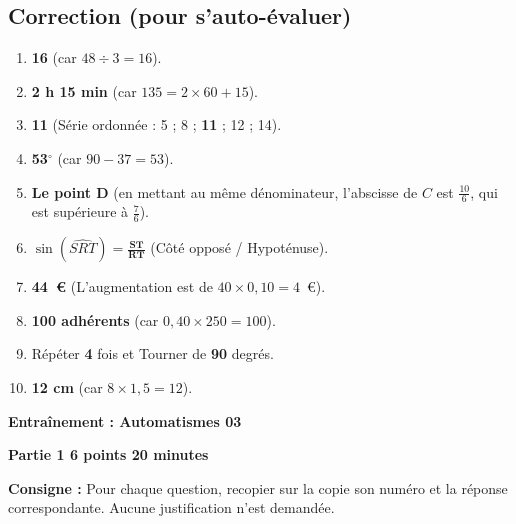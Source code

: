 \documentclass[a4paper,11pt]{article}
\begin{document}
\newpage

\subsection*{Correction (pour s'auto-évaluer)}
\begin{enumerate}[label=\textbf{\arabic*.}]
    \item \textbf{16} (car $48 \div 3 = 16$).
    \item \textbf{2 h 15 min} (car $135 = 2 \times 60 + 15$).
    \item \textbf{11} (Série ordonnée : 5 ; 8 ; \textbf{11} ; 12 ; 14).
    \item \textbf{53$^{\circ}$} (car $90 - 37 = 53$).
    \item \textbf{Le point D} (en mettant au même dénominateur, l'abscisse de $C$ est $\frac{10}{6}$, qui est supérieure à $\frac{7}{6}$).
    \item $\sin(\widehat{SRT}) = \mathbf{\frac{ST}{RT}}$ (Côté opposé / Hypoténuse).
    \item \textbf{44~€} (L'augmentation est de $40 \times 0,10 = 4$~€).
    \item \textbf{100 adhérents} (car $0,40 \times 250 = 100$).
    \item Répéter \textbf{4} fois et Tourner de \textbf{90} degrés.
    \item \textbf{12 cm} (car $8 \times 1,5 = 12$).
\end{enumerate}

\newpage

\begin{center}
    \Large\textbf{Entraînement : Automatismes 03}
\end{center}

\noindent \textbf{Partie 1 \hfill 6 points \hfill 20 minutes}

\medskip
\noindent \textbf{Consigne :} Pour chaque question, recopier sur la copie son numéro et la réponse correspondante. Aucune justification n'est demandée.

\bigskip
\end{document}
